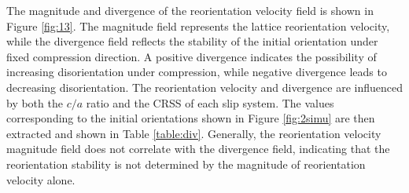 \documentclass[review]{elsarticle}
\begin{document}

The magnitude and divergence of the reorientation velocity field is shown in Figure \ref{fig:13}.
The magnitude field represents the lattice reorientation velocity, while the divergence field reflects the stability of the initial orientation under fixed compression direction.
A positive divergence indicates the possibility of increasing disorientation under compression, while negative divergence leads to decreasing disorientation.
The reorientation velocity and divergence are influenced by both the $c/a$ ratio and the CRSS of each slip system.
The values corresponding to the initial orientations shown in Figure \ref{fig:2simu} are then extracted and shown in Table \ref{table:div}.
Generally, the reorientation velocity magnitude field does not correlate with the divergence field, indicating that the reorientation stability is not determined by the magnitude of reorientation velocity alone.
\end{document}
